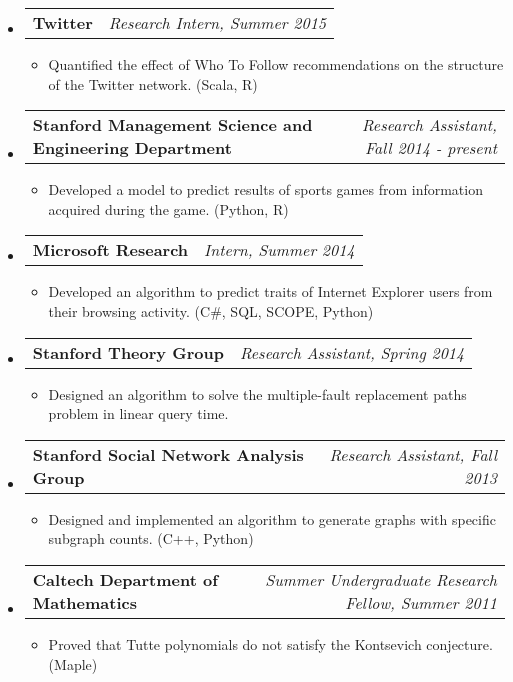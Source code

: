 \documentclass[letterpaper,10pt]{article}
\makeatletter
\newcommand{\resitem}[1]{\item #1 \vspace{-2pt}}
\newcommand{\ressubheading}[4]{
\begin{tabular*}{7.0in}{l@{\extracolsep{\fill}}r}
		\textbf{#1} & \textit{#4} \\
\end{tabular*}\vspace{-6pt}}
\makeatother
\begin{document}
\begin{itemize}
\item
	\ressubheading{Twitter}{San Francisco, CA}{Research Intern}{Research Intern, Summer 2015}
	\begin{itemize}
		\resitem{Quantified the effect of Who To Follow recommendations on the structure of the Twitter network. (Scala, R)}
	\end{itemize}
\item
	\ressubheading{Stanford Management Science and Engineering Department}{Stanford, CA}{Research Assistant}{Research Assistant, Fall 2014 - present}
	\begin{itemize}
		\resitem{Developed a model to predict results of sports games from information acquired during the game. (Python, R)}
	\end{itemize}
\item
	\ressubheading{Microsoft Research}{Mountain View, CA}{Intern}{Intern, Summer 2014}
	\begin{itemize}
		\resitem{Developed an algorithm to predict traits of Internet Explorer users from their browsing activity. (C\#, SQL, SCOPE, Python)}
	\end{itemize}
\item
	\ressubheading{Stanford Theory Group}{Stanford, CA}{Research Assistant}{Research Assistant, Spring 2014}
	\begin{itemize}
		\resitem{Designed an algorithm to solve the multiple-fault replacement paths problem in linear query time.}
	\end{itemize}
\item
	\ressubheading{Stanford Social Network Analysis Group}{Stanford, CA}{Research Assistant}{Research Assistant, Fall 2013}
	\begin{itemize}
		\resitem{Designed and implemented an algorithm to generate graphs with specific subgraph counts.  (C++, Python)}
	\end{itemize}


\item
	\ressubheading{Caltech Department of Mathematics}{Pasadena, CA}{Summer Undergraduate Research Fellow}{Summer Undergraduate Research Fellow, Summer 2011}
	\begin{itemize}
		\resitem{Proved that Tutte polynomials do not satisfy the Kontsevich conjecture.  (Maple)}
	\end{itemize}


\end{itemize}
\end{document}
